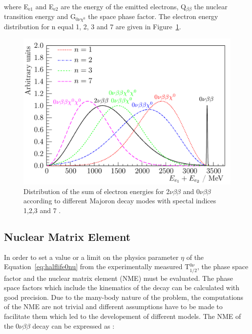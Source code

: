 \documentclass[main.tex]{subfiles}
\begin{document}
\NI where E$_{\text{e1}}$ and E$_{\text{e2}}$ are the energy of the emitted electrons, Q$_{\beta\beta}$ the nuclear transition energy and G$_{\text{0}\nu\chi^\text{0}}$ the space phase factor. The electron energy distribution for n equal 1, 2, 3 and 7 are given in Figure~\ref{DifferentbbDecaySpectrum}.


\bigskip


\begin{figure}[h!]
\begin{center}
\includegraphics[scale=0.30]{pictures/Chap2/MajoronEmissionElectronEnergySpectrum.png}
\caption{Distribution of the sum of electron energies for 2$\nu\beta\beta$ and 0$\nu\beta\beta$ according to different Majoron decay modes with spectal indices 1,2,3 and 7 \cite{FatemiGhomiThesis}.}
\label{DifferentbbDecaySpectrum}
\end{center}
\end{figure}


\FloatBarrier


\subsection{Nuclear Matrix Element}\label{sec:NME}


\NI In order to set a value or a limit on the physics parameter $\eta$ of the Equation~\ref{eq:halflife0nu} from the experimentally measured T$_{\text{1/2}}^{\text{0}\nu}$, the phase space factor and the nuclear matrix element (NME) must be evaluated. The phase space factors which include the kinematics of the decay can be calculated with good precision. Due to the many-body nature of the problem, the computations of the NME are not trivial and different assumptions have to be made to facilitate them which led to the developement of different models.  The NME of the 0$\nu\beta\beta$ decay can be expressed as :
\end{document}
